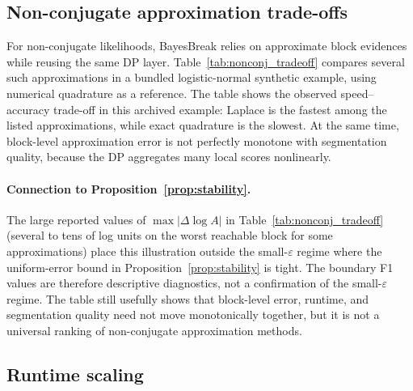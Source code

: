 \subsection{Non-conjugate approximation trade-offs}

For non-conjugate likelihoods, BayesBreak relies on approximate block evidences while reusing the
same DP layer. Table~\ref{tab:nonconj_tradeoff} compares several such approximations in a bundled
logistic-normal synthetic example, using numerical quadrature as a reference. The table shows the
observed speed--accuracy trade-off in this archived example: Laplace is the fastest among the listed approximations, while exact quadrature is the slowest. At the same time, block-level approximation error
is not perfectly monotone with segmentation quality, because the DP aggregates many local scores
nonlinearly.

\begin{table}[H]
    \centering
    
    \caption{Approximation trade-offs for a non-conjugate Bernoulli/logistic block model. Quadrature is used as the local reference block integral; the remaining methods trade block-level fidelity against computational cost.}
    \label{tab:nonconj_tradeoff}
\end{table}

\paragraph{Connection to Proposition~\ref{prop:stability}.}
The large reported values of $\max|\Delta\log A|$ in Table~\ref{tab:nonconj_tradeoff} (several to
tens of log units on the worst reachable block for some approximations) place this illustration outside the small-$\varepsilon$ regime where the uniform-error
bound in Proposition~\ref{prop:stability} is tight.
The boundary F1 values are therefore descriptive diagnostics, not a confirmation of the
small-$\varepsilon$ regime. The table still usefully shows that block-level error, runtime, and
segmentation quality need not move monotonically together, but it is not a universal ranking of
non-conjugate approximation methods.

\subsection{Runtime scaling}

